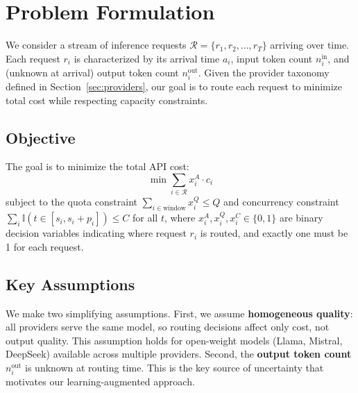 \section{Problem Formulation}
\label{sec:problem}

We consider a stream of inference requests $\mathcal{R} = \{r_1, r_2, \dots, r_T\}$ arriving over time. Each request $r_i$ is characterized by its arrival time $a_i$, input token count $n_i^{\text{in}}$, and (unknown at arrival) output token count $n_i^{\text{out}}$. Given the provider taxonomy defined in Section~\ref{sec:providers}, our goal is to route each request to minimize total cost while respecting capacity constraints.

\subsection{Objective}

The goal is to minimize the total API cost:
\[
\min \sum_{i \in \mathcal{R}} x_i^A \cdot c_i
\]
subject to the quota constraint $\sum_{i \in \text{window}} x_i^Q \le Q$ and concurrency constraint $\sum_i \mathbb{I}(t \in [s_i, s_i+p_i]) \le C$ for all $t$, where $x_i^A, x_i^Q, x_i^C \in \{0, 1\}$ are binary decision variables indicating where request $r_i$ is routed, and exactly one must be 1 for each request.

\subsection{Key Assumptions}

We make two simplifying assumptions. First, we assume \textbf{homogeneous quality}: all providers serve the same model, so routing decisions affect only cost, not output quality. This assumption holds for open-weight models (Llama, Mistral, DeepSeek) available across multiple providers. Second, the \textbf{output token count} $n_i^{\text{out}}$ is unknown at routing time. This is the key source of uncertainty that motivates our learning-augmented approach.

